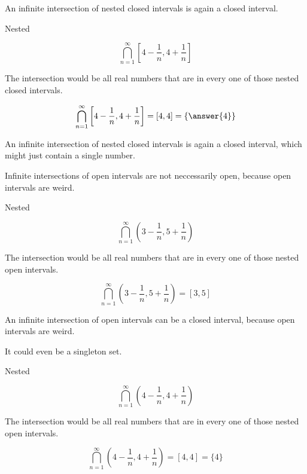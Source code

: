 \documentclass{ximera}
\begin{document}
An infinite intersection of nested closed intervals is again a closed interval. 






\begin{example} Nested


\[ \bigcap_{n=1}^{\infty}   \left[4 - \frac{1}{n}, 4 +  \frac{1}{n}\right]     \]



The intersection would be all real numbers that are in every one of those nested closed intervals.


\[ \bigcap_{n=1}^{\infty}   \left[4 -  \frac{1}{n}, 4 + \frac{1}{n}\right]    = [4, 4] = \left\{ \answer{4} \right\}  \]





\end{example}


An infinite intersection of nested closed intervals is again a closed interval, which might just contain a single number. 





Infinite intersections of open intervals are not neccessarily open, because open intervals are weird.


\begin{example} Nested


\[ \bigcap_{n=1}^{\infty}   \left(3 - \frac{1}{n}, 5 + \frac{1}{n}\right)     \]



The intersection would be all real numbers that are in every one of those nested open intervals.


\[ \bigcap_{n=1}^{\infty}   \left(3 - \frac{1}{n}, 5 + \frac{1}{n}\right)  = [3, 5]   \]





\end{example}


An infinite intersection of open intervals can be a closed interval, because open intervals are weird.


It could even be a singleton set.




\begin{example} Nested


\[ \bigcap_{n=1}^{\infty}   \left(4 - \frac{1}{n}, 4 +  \frac{1}{n}\right)     \]



The intersection would be all real numbers that are in every one of those nested open intervals.


\[ \bigcap_{n=1}^{\infty}   \left(4 -  \frac{1}{n}, 4 + \frac{1}{n}\right)    = [4, 4] = \{ 4 \}   \]





\end{example}
\end{document}
